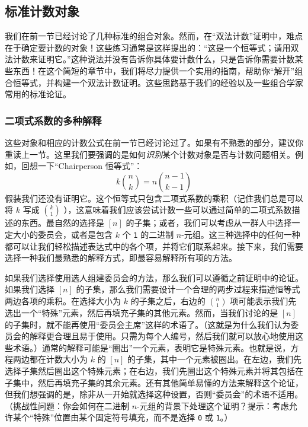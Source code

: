 
\subsection{标准计数对象}

我们在前一节已经讨论了几种标准的组合对象。然而，在``双法计数''证明中，难点在于确定要计数的对象！这些练习通常是这样提出的：``这是一个恒等式；请用双法计数来证明它。''这种说法并没有告诉你具体要计数什么，只是告诉你需要计数某些东西！在这个简短的章节中，我们将尽力提供一个实用的指南，帮助你``解开''组合恒等式，并构建一个双法计数证明。这些思路基于我们的经验以及一些组合学家常用的标准论证。

\subsubsection*{二项式系数的多种解释}

这些对象和相应的计数公式在前一节已经讨论过了。如果有不熟悉的部分，建议你重读上一节。这里我们要强调的是如何\emph{识别}某个计数对象是否与计数问题相关。例如，回想一下``Chairperson 恒等式''：
\[k{n \choose k} = n{n-1 \choose k-1}\]
假装我们还没有证明它。这个恒等式只包含二项式系数的乘积（记住我们总是可以将 $k$ 写成 ${k \choose 1}$ ），这意味着我们应该尝试计数一些可以通过简单的二项式系数描述的东西。最自然的选择是 $[n]$ 的子集；或者，我们可以考虑从一群人中选择一定大小的委员会，或者是包含 $k$ 个 \verb|1| 的二进制 $n$-元组。这三种选择中的任何一种都可以让我们轻松描述表达式中的各个项，并将它们联系起来。接下来，我们需要选择一种我们最熟悉的解释方式，即最容易解释所有项的方法。

如果我们选择使用选人组建委员会的方法，那么我们可以遵循之前证明中的论证。如果我们选择 $[n]$ 的子集，那么我们需要设计一个合理的两步过程来描述恒等式两边各项的乘积。在选择大小为 $k$ 的子集之后，右边的 ${n \choose 1}$ 项可能表示我们先选出一个``特殊''元素，然后再填充子集的其他元素。然而，当我们讨论的是 $[n]$ 的子集时，就不能再使用``委员会主席''这样的术语了。（这就是为什么我们认为委员会的解释更合理且易于使用。只需为每个人编号，然后我们就可以放心地使用这些术语。）通常的解释可能是``圈出''一个元素，表明它是特殊元素。也就是说，方程两边都在计数大小为 $k$ 的 $[n]$ 的子集，其中一个元素被圈出。在左边，我们先选择子集然后圈出这个特殊元素；在右边，我们先圈出这个特殊元素并将其包括在子集中，然后再填充子集的其余元素。还有其他简单易懂的方法来解释这个论证，但我们想强调的是，除非从一开始就选择这种设置，否则``委员会''的术语不适用。（挑战性问题：你会如何在二进制 $n$-元组的背景下处理这个证明？提示：考虑允许某个``特殊''位置由某个固定符号填充，而不是选择 \verb|0| 或 \verb|1|。）

